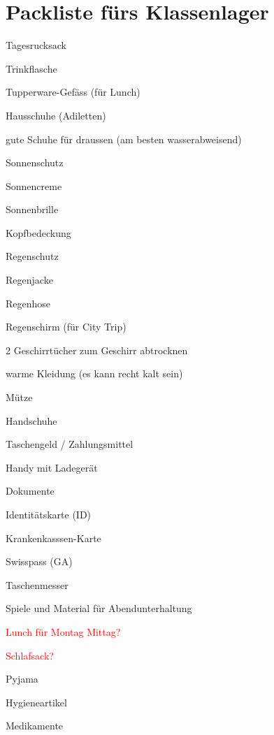 \section*{Packliste fürs Klassenlager}
\begin{todolist}
  \item Tagesrucksack
  \item Trinkflasche
  \item Tupperware-Gefäss (für Lunch)
  \item Hausschuhe (Adiletten)
  \item gute Schuhe für draussen (am besten wasserabweisend)
  \item Sonnenschutz
  \begin{todolist}
    \item Sonnencreme
    \item Sonnenbrille
    \item Kopfbedeckung
  \end{todolist}
   \item Regenschutz
    \begin{todolist}
      \item Regenjacke
      \item Regenhose
      \item Regenschirm (für City Trip)
    \end{todolist}
  \item 2 Geschirrtücher zum Geschirr abtrocknen
  \item warme Kleidung (es kann recht kalt sein)
    \begin{todolist}
      \item Mütze
      \item Handschuhe
    \end{todolist}
  \item Taschengeld / Zahlungsmittel
  \item Handy mit Ladegerät
  \item Dokumente
    \begin{todolist}
    \item Identitätskarte (ID)
    \item Krankenkasssen-Karte
    \item Swisspass (GA)
    \end{todolist}
  \item Taschenmesser
  \item Spiele und Material für Abendunterhaltung
  \item \textcolor{Red}{Lunch für Montag Mittag?}
  \item \textcolor{Red}{Schlafsack?}
  \item Pyjama
  \item Hygieneartikel
  \item Medikamente
 \end{todolist}

